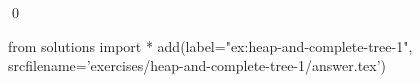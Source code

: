 
\begin{ex} 
  \label{ex:heap-and-complete-tree-1}
  
  \qed
\end{ex} 
\begin{python0}
from solutions import *
add(label="ex:heap-and-complete-tree-1",
    srcfilename='exercises/heap-and-complete-tree-1/answer.tex') 
\end{python0}

